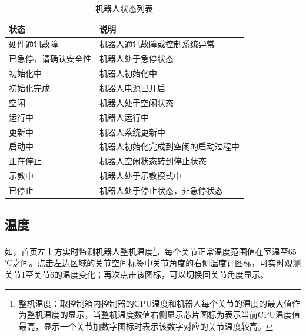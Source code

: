\begin{table}[ht]
    \centering\small
    \begin{tabular}{|l|l|}\hline
\sf 状态 & \sf 说明\\\hline
硬件通讯故障 & 机器人通讯故障或控制系统异常\\\hline
已急停，请确认安全性 & 机器人处于急停状态\\\hline
初始化中 & 机器人初始化中\\\hline
初始化完成 & 机器人电源已开启\\\hline
空闲 & 机器人处于空闲状态\\\hline
运行中 & 机器人运行中\\\hline
更新中 & 机器人系统更新中\\\hline
启动中 & 机器人初始化完成到空闲的启动过程中\\\hline
正在停止 & 机器人空闲状态转到停止状态\\\hline
示教中 & 机器人处于示教模式中\\\hline
已停止 & 机器人处于停止状态，非急停状态\\\hline
    \end{tabular}
    \caption{机器人状态列表}
    \label{tab:机器人状态列表}
\end{table}

\subsection{温度}
如，\LM 首页左上方实时监测机器人整机温度\footnote{整机温度：取控制箱内控制器的CPU温度和机器人每个关节的温度的最大值作为整机温度的显示，当整机温度数值右侧显示芯片图标为表示当前CPU温度值最高，显示一个关节加数字图标时表示该数字对应的关节温度较高。}，每个关节正常温度范围值在室温至65 ℃之间。点击左边区域的关节空间标签中关节角度的右侧温度计图标，可实时观测关节1至关节6的温度变化；再次点击该图标，可以切换回关节角度显示。


